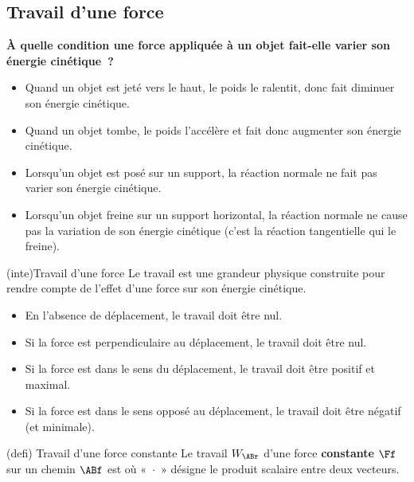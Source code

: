 \documentclass[../../main/main.tex]{subfiles}
\begin{document}
\subsection{Travail d'une force}

\noindent
\textbf{À quelle condition une force appliquée à un objet fait-elle varier son
	énergie cinétique~?}
\begin{itemize}
	\item Quand un objet est jeté vers le haut, le poids le ralentit, donc fait
	      diminuer son énergie cinétique.
	\item Quand un objet tombe, le poids l'accélère et fait donc augmenter son
	      énergie cinétique.
	\item Lorsqu'un objet est posé sur un support, la réaction normale ne fait
	      pas varier son énergie cinétique.
	\item Lorsqu'un objet freine sur un support horizontal, la réaction normale
	      ne cause pas la variation de son énergie cinétique (c'est la réaction
	      tangentielle qui le freine).
\end{itemize}
\begin{tcb*}(inte){Travail d'une force}
	Le travail est une grandeur physique construite pour rendre compte de
	l'effet d'une force sur son énergie cinétique.
\end{tcb*}

\begin{itemize}
	\item En l'absence de déplacement, le travail doit être nul.
	\item Si la force est perpendiculaire au déplacement, le travail doit être
	      nul.
	\item Si la force est dans le sens du déplacement, le travail doit être
	      positif et maximal.
	\item Si la force est dans le sens opposé au déplacement, le travail doit
	      être négatif (et minimale).
\end{itemize}

\begin{tcb*}[sidebyside, sidebyside align=top](defi)
	{Travail d'une force constante}
	Le travail $W_{\ABr}$ d'une force \textbf{constante} $\Ff$ sur un chemin $\ABf$ est
	\psw{%
		\[\boxed{W_{\ABr}(\Ff) = \Ff\cdot\ABf}\]
	}%
	où «~$\cdot$~» désigne le produit scalaire entre deux vecteurs.
	\tcblower
\end{tcb*}
\end{document}
